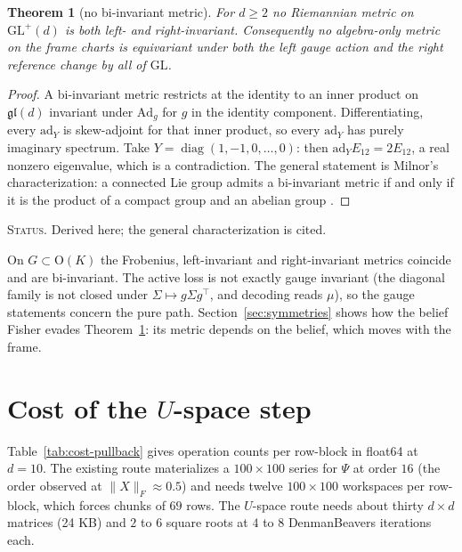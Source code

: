 \documentclass[11pt]{article}
\newtheorem{theorem}{Theorem}[section]
\theoremstyle{definition}
\theoremstyle{remark}
\newcommand{\gl}{\mathfrak{gl}}
\newcommand{\GL}{\mathrm{GL}}
\newcommand{\ad}{\mathrm{ad}}
\newcommand{\Ad}{\mathrm{Ad}}
\newcommand{\ndash}{\textendash}
\newcommand{\status}[1]{\par\smallskip\noindent\textsc{Status.} #1\par\smallskip}
\begin{document}
\begin{theorem}[no bi-invariant metric]\label{thm:milnor}
For $d\ge2$ no Riemannian metric on $\GL^+(d)$ is both left- and right-invariant. Consequently no algebra-only metric on the frame charts is equivariant under both the left gauge action and the right reference change by all of $\GL$.
\end{theorem}
\begin{proof}
A bi-invariant metric restricts at the identity to an inner product on $\gl(d)$ invariant under $\Ad_g$ for $g$ in the identity component. Differentiating, every $\ad_Y$ is skew-adjoint for that inner product, so every $\ad_Y$ has purely imaginary spectrum. Take $Y=\operatorname{diag}(1,-1,0,\dots,0)$: then $\ad_YE_{12}=2E_{12}$, a real nonzero eigenvalue, which is a contradiction. The general statement is Milnor's characterization: a connected Lie group admits a bi-invariant metric if and only if it is the product of a compact group and an abelian group \cite[Lemma~7.5]{Milnor1976}.
\end{proof}
\status{Derived here; the general characterization is cited.}

On $G\subset\mathrm{O}(K)$ the Frobenius, left-invariant and right-invariant metrics coincide and are bi-invariant. The active loss is not exactly gauge invariant (the diagonal family is not closed under $\Sigma\mapsto g\Sigma g^\top$, and decoding reads $\mu$), so the gauge statements concern the pure path. Section~\ref{sec:symmetries} shows how the belief Fisher evades Theorem~\ref{thm:milnor}: its metric depends on the belief, which moves with the frame.

\section{Cost of the \texorpdfstring{$U$}{U}-space step}\label{sec:cost-pullback}

Table~\ref{tab:cost-pullback} gives operation counts per row-block in float64 at $d=10$. The existing route materializes a $100\times100$ series for $\Psi$ at order $16$ (the order observed at $\|X\|_F\approx0.5$) and needs twelve $100\times100$ workspaces per row-block, which forces chunks of $69$ rows. The $U$-space route needs about thirty $d\times d$ matrices (24 KB) and $2$ to $6$ square roots at $4$ to $8$ Denman\ndash Beavers iterations each.
\end{document}
